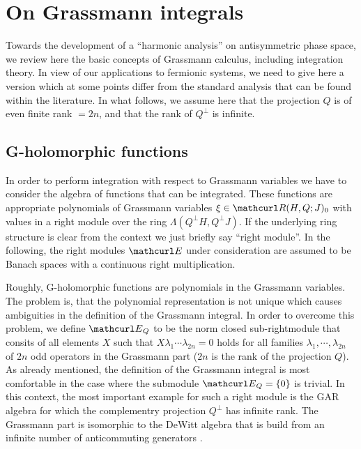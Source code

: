\documentclass[pra,twoside,amsmath,amsfonts,amssymb,superscriptaddress,showpacs]{revtex4}
\def\9#1{{\mathcurl #1}}
\newcommand{\GR}[2]{\Lambda(#1,#2)}
\newcommand{\PHSP}[3]{\9R(#1,#3;#2)}
\begin{document}



\section{On Grassmann integrals}
\label{sec:grasscalc}
Towards the development of a ``harmonic analysis'' on antisymmetric phase space, we review here
the basic concepts of Grassmann calculus, including integration theory. In view of our applications
to fermionic systems, we need to give here a version which at some points differ from the standard
analysis that can be found within the literature. In what follows, we assume here that the
projection $Q$ is of even finite rank $=2n$, and that the rank of
$Q^\perp$ is infinite.

\subsection{G-holomorphic functions}
\label{subsec:G-hol}
In order to perform integration with respect to Grassmann variables we have to consider the 
algebra of functions that can be integrated. These functions are appropriate polynomials of
Grassmann variables $\xi\in\PHSP{H}{J}{Q}_0$ with values in a right module over the ring
$\GR{Q^\perp H}{Q^\perp J}$. If the underlying ring structure is clear from the context we just
briefly say ``right module''. In the following, the right modules $\9E$ under consideration are
assumed to be Banach spaces with a continuous right multiplication.

Roughly, G-holomorphic functions are polynomials in the Grassmann variables. The problem is, that
the polynomial representation is not unique which causes ambiguities in the definition of the
Grassmann integral. In order to overcome this problem, we define $\9E_Q$ to be the norm closed
sub-rightmodule that consits of all elements $X$ such that $X\lambda_1\cdots\lambda_{2n}=0$
holds for all families $\lambda_1,\cdots, \lambda_{2n}$ of $2n$ odd operators in the Grassmann
part ($2n$ is the rank of the projection $Q$). As already mentioned, the definition of the
Grassmann integral is most comfortable in the case where the submodule $\9E_Q=\{0\}$ is trivial. 
In this context, the most important example for such a right module is the GAR algebra for
which the complementry projection $Q^\perp$ has infinite rank. The Grassmann part
is isomorphic to the DeWitt algebra that is build from an infinite number of
anticommuting generators \cite{ChoBruDeWitt89}.
\end{document}
